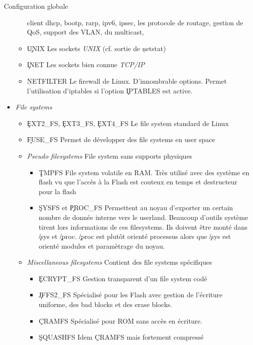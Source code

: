 \begin{frame}[fragile=singleslide]{Configuration globale}
\begin{itemize}
\begin{itemize}
      client dhcp, bootp, rarp, ipv6, ipsec, les protocole de routage,
      gestion de QoS, support des VLAN, du multicast,
    \item \c{UNIX} Les sockets \emph{UNIX} (cf. sortie de \c{netstat})
    \item \c{INET} Les sockets bien connue \emph{TCP/IP}
    \item \c{NETFILTER} Le  firewall de Linux.  D'innombrable options.
      Permet  l'utilisation d'iptables  si  l'option \c{IPTABLES}  est
      active.
    \end{itemize} 
  \item \emph{File systems} 
    \begin{itemize}
    \item  \c{EXT2_FS},   \c{EXT3_FS},  \c{EXT4_FS}  Le   file  system
      standard de Linux
    \item \c{FUSE_FS}  Permet de développer  des file systems  en user
      space
    \item   \emph{Pseudo  filesystems}   File  system   sans  supports
      physiques
      \begin{itemize} 
      \item \c{TMPFS} File system  volatile en RAM.  Très utilisé avec
        des système en flash vu que  l'accès à la Flash est couteux en
        temps et destructeur pour la flash
      \item \c{SYSFS} et \c{PROC_FS} Permettent au noyau d'exporter un
        certain nombre  de donnée  interne vers le  userland. Beaucoup
        d'outils système tirent  lors informations de ces filesystems.
        Ils doivent  être monté dans \c{/sys}  et \c{/proc}. \c{/proc}
        est plutôt  orienté processus  alors que \c{/sys}  est orienté
        modules et paramètrage du noyau.
      \end{itemize} 
    \item \emph{Miscellaneous  filesystems} Contient des  file systems
      spécifiques
      \begin{itemize} 
      \item \c{ECRYPT_FS} Gestion transparent d'un file system codé
      \item  \c{JFFS2_FS} Spécialisé  pour les  Flash avec  gestion de
        l'écriture uniforme, des bad blocks et des erase blocks.
      \item \c{CRAMFS} Spécialisé pour ROM sans accès en écriture. 
      \item  \c{SQUASHFS} Idem \c{CRAMFS} mais fortement compressé
      \end{itemize} 

\end{itemize}
\end{itemize}
\end{frame}
